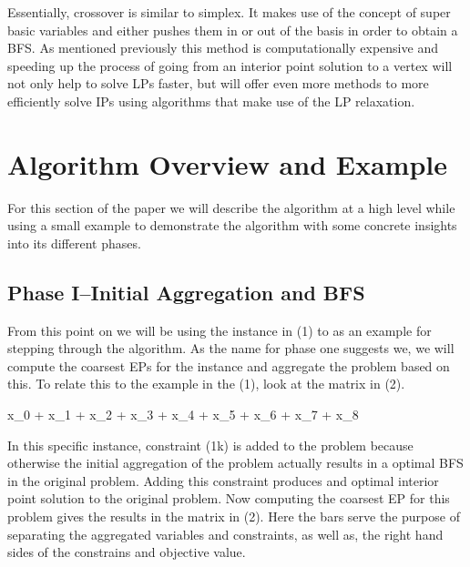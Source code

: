 \documentclass[11pt]{article} %
\begin{document}
 	Essentially, crossover is similar to simplex.  It makes use of the concept of super basic variables and either pushes them in or out of the basis in order to obtain a BFS.  As mentioned previously this method is computationally expensive and speeding up the process of going from an interior point solution to a vertex will not only help to solve LPs faster, but will offer even more methods to more efficiently solve IPs using algorithms that make use of the LP relaxation.
 	
 	\section*{Algorithm Overview and Example}
 	For this section of the paper we will describe the algorithm at a high level while using a small example to demonstrate the algorithm with some concrete insights into its different phases.
 	\subsection*{Phase I--Initial Aggregation and BFS} 
 	From this point on we will be using the instance in (1) to as an example for stepping through the algorithm.  As the name for phase one suggests we, we will compute the coarsest EPs for the instance and aggregate the problem based on this.  To relate this to the example in the (1), look at the matrix in (2).
 	
	 \begin{mini!}
	 	{}{x_0 + x_1 + x_2 + x_3 + x_4 + x_5 + x_6 + x_7 + x_8}{}{}
	 \end{mini!}	
 
	In this specific instance, constraint (1k) is added to the problem because otherwise the initial aggregation of the problem actually results in a optimal BFS in the original problem.  Adding this constraint produces and optimal interior point solution to the original problem.  Now computing the coarsest EP for this problem gives the results in the matrix in (2).  Here the  bars serve the purpose of separating the aggregated variables and constraints, as well as, the right hand sides of the constrains and objective value. 
	
\end{document}
